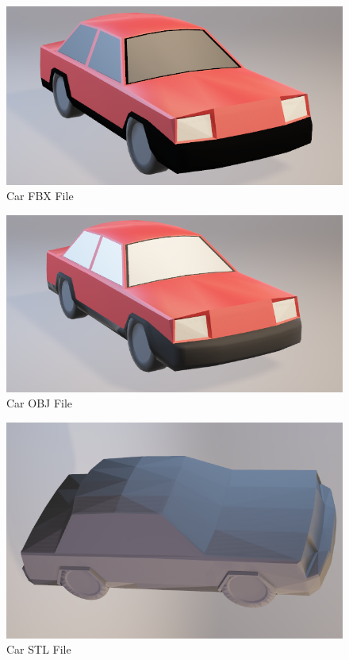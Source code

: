 \begin{figure}[H]
    \centering
    \includegraphics[width=\textwidth]{Car-FBX.png}
    \caption{Car FBX File}
    \label{Car-FBX}
\end{figure}

\begin{figure}[H]
    \centering
    \includegraphics[width=\textwidth]{Car-OBJ.png}
    \caption{Car OBJ File}
    \label{Car-OBJ}
\end{figure}

\begin{figure}[H]
    \centering
    \includegraphics[width=\textwidth]{Car-STL.png}
    \caption{Car STL File}
    \label{Car-STL}
\end{figure}

